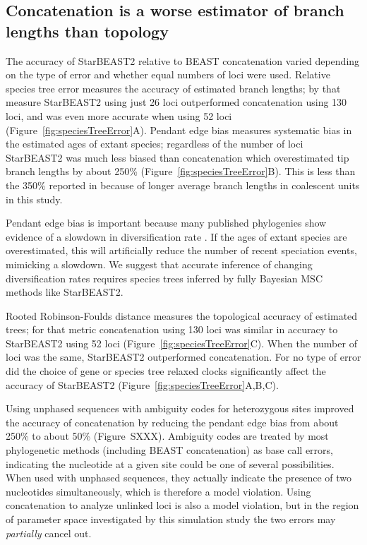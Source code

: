 \documentclass[nogrid]{MBE}%
\begin{document}
\subsection{Concatenation is a worse estimator of branch lengths than topology}

The accuracy of StarBEAST2 relative to BEAST concatenation varied depending on
the type of error and whether equal numbers of loci were used. Relative
species tree error measures the accuracy of estimated branch lengths; by that
measure StarBEAST2 using just 26 loci outperformed concatenation using 130
loci, and was even more accurate when using 52 loci
(Figure~\ref{fig:speciesTreeError}A). Pendant edge bias measures systematic
bias in the estimated ages of extant species; regardless of the number of loci
StarBEAST2 was much less biased than concatenation which overestimated tip
branch lengths by about 250\% (Figure~\ref{fig:speciesTreeError}B). This is
less than the 350\% reported in \cite{Ogilvie01052016} because of longer
average branch lengths in coalescent units in this study.

Pendant edge bias is important because many published phylogenies show
evidence of a slowdown in diversification rate \citep{Moen2014190}. If the
ages of extant species are overestimated, this will artificially reduce the
number of recent speciation events, mimicking a slowdown. We suggest that
accurate inference of changing diversification rates requires species trees
inferred by fully Bayesian MSC methods like StarBEAST2.

Rooted Robinson-Foulds distance measures the topological accuracy of estimated
trees; for that metric concatenation using 130 loci was similar in accuracy to
StarBEAST2 using 52 loci (Figure~\ref{fig:speciesTreeError}C). When the number
of loci was the same, StarBEAST2 outperformed concatenation. For no type of
error did the choice of gene or species tree relaxed clocks significantly
affect the accuracy of StarBEAST2 (Figure~\ref{fig:speciesTreeError}A,B,C).

Using unphased sequences with ambiguity codes for heterozygous sites improved
the accuracy of concatenation by reducing the pendant edge bias from about
250\% to about 50\% (Figure~SXXX). Ambiguity codes are treated by most
phylogenetic methods (including BEAST concatenation) as base call errors,
indicating the nucleotide at a given site could be one of several
possibilities. When used with unphased sequences, they actually indicate the
presence of two nucleotides simultaneously, which is therefore a model violation.
Using concatenation to analyze unlinked loci is also a model violation, but in
the region of parameter space investigated by this simulation study the two
errors may \textit{partially} cancel out.
\end{document}
